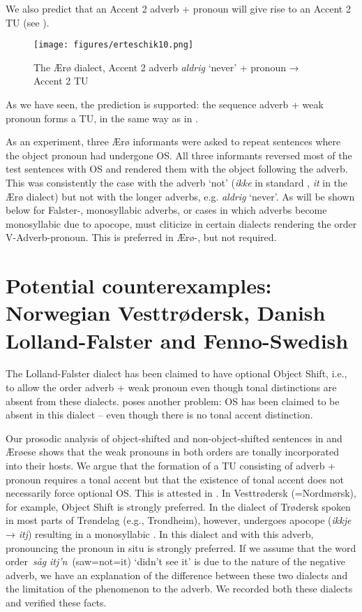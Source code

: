 \documentclass[output=paper]{LSP/langsci}
\begin{document}
We also predict that an Accent 2 adverb + pronoun will give rise to an Accent 2 TU (see ).

  

 

\begin{figure}
\texttt{[image: figures/erteschik10.png]}
\caption{The Ærø dialect, Accent 2 adverb \textit{aldrig} ‘never’  + pronoun → Accent 2 TU}
\label{fig:erteschik:10}
\end{figure}

As we have seen, the prediction is supported: the sequence adverb + weak pronoun forms a TU, in the same way as in .

As an experiment, three Ærø informants were asked to repeat sentences where the object pronoun had undergone OS. All three informants reversed most of the test sentences with OS and rendered them with the object following the adverb. This was consistently the case with the adverb ‘not’ (\textit{ikke} in standard , \textit{it} in the Ærø dialect) but not with the longer adverbs, e.g. \textit{aldrig} ‘never’. As will be shown below for Falster-, monosyllabic adverbs, or cases in which adverbs become monosyllabic due to apocope, must cliticize in certain dialects rendering the order V-Adverb-pronoun. This is preferred in Ærø-, but not required.

\section{Potential counterexamples: Norwegian Vesttrødersk, Danish Lolland-Falster and Fenno-Swedish}\label{sec:erteschik:5}

The Lolland-Falster dialect has been claimed to have optional Object Shift, i.e., to allow the order adverb + weak pronoun even though tonal distinctions are absent from these dialects.  poses another problem: OS has been claimed to be absent in this dialect – even though there is no tonal accent distinction. 

Our prosodic analysis of object-shifted and non-object-shifted sentences in  and Ærøese shows that the weak pronouns in both orders are tonally incorporated into their hosts. We argue that the formation of a TU consisting of adverb + pronoun requires a tonal accent but that the existence of tonal accent does not necessarily {force} optional OS. This is attested in . In Vesttrødersk (=Nordmørsk), for example, Object Shift is strongly preferred. In the dialect of Trødersk spoken in most parts of Trøndelag (e.g., Trondheim), however,  undergoes apocope (\textit{ikkje} → \textit{itj}) resulting in a monosyllabic . In this dialect and with this adverb, pronouncing the pronoun in situ is strongly preferred. If we assume that the word order~\textit{såg} \textit{itj'n}~(saw=not=it) ‘didn’t see it’ is due to the  nature of the negative adverb, we have an explanation of the difference between these two dialects and the limitation of the phenomenon to the  adverb. We recorded both these dialects and verified these facts.
\end{document}
